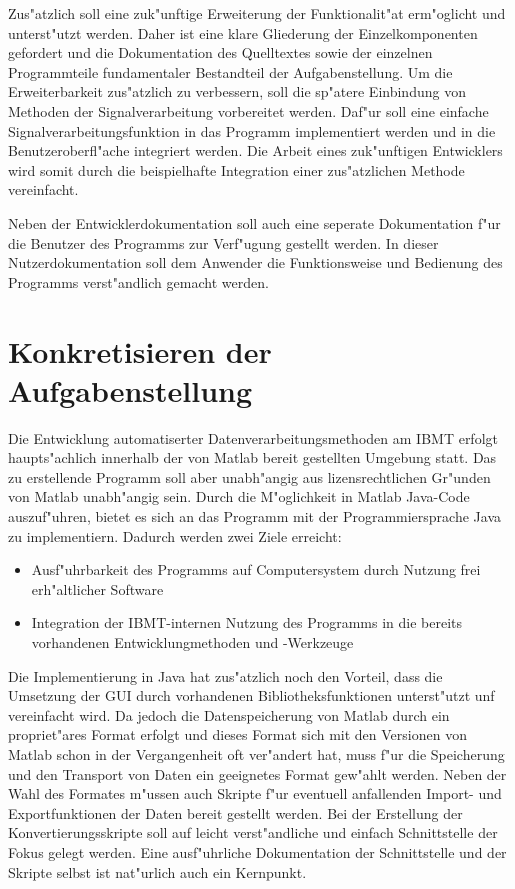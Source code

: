 Zus"atzlich soll eine zuk"unftige Erweiterung der Funktionalit"at erm"oglicht und unterst"utzt werden.
Daher ist eine klare Gliederung der Einzelkomponenten gefordert und die Dokumentation des Quelltextes sowie der einzelnen Programmteile fundamentaler Bestandteil der Aufgabenstellung.
Um die Erweiterbarkeit zus"atzlich zu verbessern, soll die sp"atere Einbindung von Methoden der Signalverarbeitung vorbereitet werden.
Daf"ur soll eine einfache Signalverarbeitungsfunktion in das Programm implementiert werden und in die Benutzeroberfl"ache integriert werden.
Die Arbeit eines zuk"unftigen Entwicklers wird somit durch die beispielhafte Integration einer zus"atzlichen Methode vereinfacht.

Neben der Entwicklerdokumentation soll auch eine seperate Dokumentation f"ur die Benutzer des Programms zur Verf"ugung gestellt werden.
In dieser Nutzerdokumentation soll dem Anwender die Funktionsweise und Bedienung des Programms verst"andlich gemacht werden.



\section{Konkretisieren der Aufgabenstellung}

Die Entwicklung automatiserter Datenverarbeitungsmethoden am \ac{IBMT} erfolgt haupts"achlich innerhalb der von Matlab bereit gestellten Umgebung statt.
Das zu erstellende Programm soll aber unabh"angig aus lizensrechtlichen Gr"unden von Matlab unabh"angig sein.
Durch die M"oglichkeit in Matlab Java-Code auszuf"uhren, bietet es sich an das Programm mit der Programmiersprache Java zu implementiern.
Dadurch werden zwei Ziele erreicht:
\begin{itemize}
	\item Ausf"uhrbarkeit des Programms auf Computersystem durch Nutzung frei erh"altlicher Software
	\item Integration der \ac{IBMT}-internen Nutzung des Programms in die bereits vorhandenen Entwicklungmethoden und -Werkzeuge
\end{itemize}
Die Implementierung in Java hat zus"atzlich noch den Vorteil, dass die Umsetzung der \ac{GUI} durch vorhandenen Bibliotheksfunktionen unterst"utzt unf vereinfacht wird.
Da jedoch die Datenspeicherung von Matlab durch ein propriet"ares Format erfolgt und dieses Format sich mit den Versionen von Matlab schon in der Vergangenheit oft ver"andert hat, muss f"ur die Speicherung und den Transport von Daten ein geeignetes Format gew"ahlt werden.
Neben der Wahl des Formates m"ussen auch Skripte f"ur eventuell anfallenden Import- und Exportfunktionen der Daten bereit gestellt werden.
Bei der Erstellung der Konvertierungsskripte soll auf leicht verst"andliche und einfach Schnittstelle der Fokus gelegt werden.
Eine ausf"uhrliche Dokumentation der Schnittstelle und der Skripte selbst ist nat"urlich auch ein Kernpunkt.

